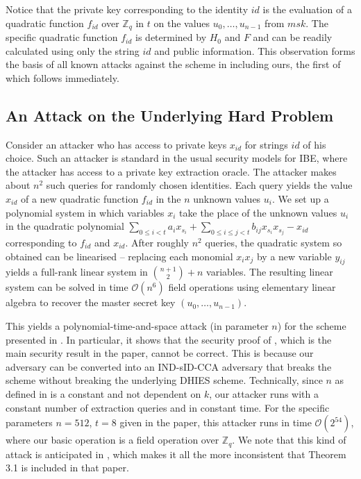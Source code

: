 \documentclass{llncs}
\newcommand{\ring}[1]{\mathbb{#1}}
\newcommand{\Z}{\ensuremath{\ring{Z}}\xspace}
\newcommand{\ord}[1]{\ensuremath{\mathcal{O}\!\left(#1\right)}}
\begin{document}
Notice that the private key corresponding to the identity $id$ is the evaluation of a quadratic function $f_{id}$ over $\Z_q$ in $t$ on the values $u_0,\ldots,u_{n-1}$ from $msk$. The specific quadratic function $f_{id}$ is determined by $H_0$ and $F$ and can be readily calculated using only the string $id$ and public information. This observation forms the basis of all known attacks against the scheme in \cite{CCGHC10} including ours, the first of which follows immediately.

\subsection{An Attack on the Underlying Hard Problem}
Consider an attacker who has access to private keys $x_{id}$ for strings $id$ of his choice. Such an attacker is standard in the usual security models for IBE, where the attacker has access to a private key extraction oracle. The attacker makes about $n^2$ such queries for randomly chosen identities. Each query yields the value $x_{id}$ of a new quadratic function $f_{id}$ in the $n$ unknown values $u_i$. We set up a polynomial system in which variables $x_i$ take the place of the unknown values $u_i$ in the quadratic polynomial $\sum_{0 \le i < t}a_ix_{s_i} + \sum_{0 \le i \le j < t} b_{ij}x_{s_i}x_{s_j} - x_{id}$ corresponding to $f_{id}$ and $x_{id}$. After roughly $n^2$ queries, the quadratic system so obtained can be linearised -- replacing each monomial $x_ix_j$ by a new variable $y_{ij}$ yields a full-rank linear system in ${n+1 \choose 2}+n$ variables. The resulting linear system can be solved in time $\ord{n^6}$ field operations using elementary linear algebra to recover the master secret key $(u_0,\ldots,u_{n-1})$.

This yields a polynomial-time-and-space attack (in parameter $n$) for the scheme presented in \cite{CCGHC10}. In particular, it shows that the security proof of \cite[Theorem 3.1]{CCGHC10}, which is the main security result in the paper, cannot be correct. This is because our adversary can be converted into an IND-sID-CCA adversary that breaks the scheme without breaking the underlying DHIES scheme. Technically, since $n$ as defined in \cite{CCGHC10} is a constant and not dependent on $k$, our attacker runs with a constant number of extraction queries and in constant time. For the specific parameters $n=512$, $t=8$ given in the paper, this attacker runs in time $\ord{2^{54}}$, where our basic operation is a field operation over $\Z_q$. We note that this kind of attack is anticipated in \cite[Section 3.1]{CCGHC10}, which makes it all the more inconsistent that Theorem 3.1 is included in that paper.
\end{document}
